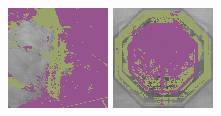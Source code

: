 \documentclass{article}
\begin{document}
\begin{figure}[t]
\begin{minipage}[c]{.21\linewidth}
  \end{minipage}
  \begin{minipage}[c]{.21\linewidth}
    \centering\centerline{\includegraphics[width=\linewidth]{imgs/dennis_cal/saxophone/products/100.png}}
  \end{minipage}
  \begin{minipage}[c]{.21\linewidth}
    \centering\centerline{\includegraphics[width=\linewidth]{imgs/dennis_cal/stop/products/100.png}}

\end{minipage}
\end{figure}
\end{document}
